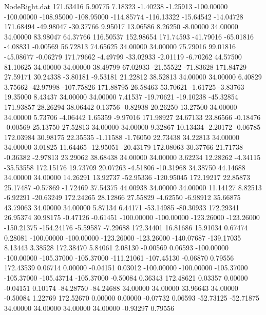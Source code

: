 \begin{filecontents}{NodeRight.dat}
 171.63416    5.90775    7.18323    -1.40238   -1.25913 -100.00000 -100.00000 -108.95000 -108.95000 -114.85774 -116.13322  -15.64542  -14.04728
 171.68494  -49.98047  -30.37766     9.95017   13.06586    8.26250   -8.00000   34.00000   34.00000   83.98047   64.37766  116.50537  152.98654
 171.74593  -41.79016  -65.01816    -4.08831   -0.00569   56.72813   74.65625   34.00000   34.00000   75.79016   99.01816  -45.08677   -0.06279
 171.79662   -4.49799  -33.02933    -2.01119   -6.70262   44.57500   81.10625   34.00000   34.00000   38.49799   67.02933  -21.55522  -71.83628
 171.84729   27.59171   30.24338    -3.80181   -9.53181   21.22812   38.52813   34.00000   34.00000    6.40829    3.75662  -42.97998 -107.75826
 171.88795   26.58463   53.70621    -1.61725   -3.83763   19.35000    8.43437   34.00000   34.00000    7.41537  -19.70621  -19.10238  -45.32854
 171.93857   28.26294   38.06442     0.13756   -0.82938   20.26250   13.27500   34.00000   34.00000    5.73706   -4.06442    1.65359   -9.97016
 171.98927   24.67133   23.86566    -0.18476   -0.00569   25.13750   27.52813   34.00000   34.00000    9.32867   10.13434   -2.20172   -0.06785
 172.03984   30.98175   22.35535    -1.11588   -1.76050   22.73438   34.22813   34.00000   34.00000    3.01825   11.64465  -12.95051  -20.43179
 172.08063   30.37766   21.71738    -0.36382   -2.97813   23.29062   38.68438   34.00000   34.00000    3.62234   12.28262   -4.34115  -35.53558
 172.15176   19.73709   20.07263    -4.51806  -10.31968   34.38750   44.14688   34.00000   34.00000   14.26291   13.92737  -52.95336 -120.95045
 172.19217   22.85873   25.17487    -0.57869   -1.72469   37.54375   44.00938   34.00000   34.00000   11.14127    8.82513   -6.92291  -20.63249
 172.24265   28.12866   27.55829    -4.62550   -6.98912   35.66875   43.79063   34.00000   34.00000    5.87134    6.44171  -53.14985  -80.30933
 172.29341   26.95374   30.98175    -0.47126   -0.61451 -100.00000 -100.00000 -123.26000 -123.26000 -150.21375 -154.24176   -5.59587   -7.29688
 172.34401   16.81686   15.91034     0.67474    0.28081 -100.00000 -100.00000 -123.26000 -123.26000 -140.07687 -139.17035    8.13443    3.38528
 172.38470    5.84061    2.08130    -0.00569    0.06593 -100.00000 -100.00000 -105.37000 -105.37000 -111.21061 -107.45130   -0.06870    0.79556
 172.43539    0.06714    0.00000    -0.04151    0.03012 -100.00000 -100.00000 -105.37000 -105.37000 -105.43714 -105.37000   -0.50084    0.36343
 172.48621    0.03357    0.00000    -0.04151    0.10174  -84.28750  -84.24688   34.00000   34.00000   33.96643   34.00000   -0.50084    1.22769
 172.52670    0.00000    0.00000    -0.07732    0.06593  -52.73125  -52.71875   34.00000   34.00000   34.00000   34.00000   -0.93297    0.79556

\end{filecontents}
